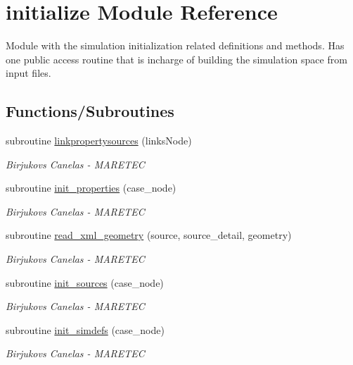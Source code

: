 \hypertarget{namespaceinitialize}{}\section{initialize Module Reference}
\label{namespaceinitialize}


Module with the simulation initialization related definitions and methods. Has one public access routine that is incharge of building the simulation space from input files.  


\subsection*{Functions/\+Subroutines}
\begin{DoxyCompactItemize}
\item 
subroutine \hyperlink{namespaceinitialize_ab91b27efd537a161ee9ca4b2d9efde1a}{linkpropertysources} (links\+Node)
\begin{DoxyCompactList}\small\item\em Birjukovs Canelas -\/ M\+A\+R\+E\+T\+EC \end{DoxyCompactList}\item 
subroutine \hyperlink{namespaceinitialize_a4640ad15e29b88467ec842f274f64b62}{init\+\_\+properties} (case\+\_\+node)
\begin{DoxyCompactList}\small\item\em Birjukovs Canelas -\/ M\+A\+R\+E\+T\+EC \end{DoxyCompactList}\item 
subroutine \hyperlink{namespaceinitialize_ad36e4f602dab66c06a1f0e2474e9f0a6}{read\+\_\+xml\+\_\+geometry} (source, source\+\_\+detail, geometry)
\begin{DoxyCompactList}\small\item\em Birjukovs Canelas -\/ M\+A\+R\+E\+T\+EC \end{DoxyCompactList}\item 
subroutine \hyperlink{namespaceinitialize_a9ed75476e5dd07928aed3442281930be}{init\+\_\+sources} (case\+\_\+node)
\begin{DoxyCompactList}\small\item\em Birjukovs Canelas -\/ M\+A\+R\+E\+T\+EC \end{DoxyCompactList}\item 
subroutine \hyperlink{namespaceinitialize_adb972e92da4789506ee6b62b702df2b3}{init\+\_\+simdefs} (case\+\_\+node)
\begin{DoxyCompactList}\small\item\em Birjukovs Canelas -\/ M\+A\+R\+E\+T\+EC \end{DoxyCompactList}\item 

\end{DoxyCompactItemize}

